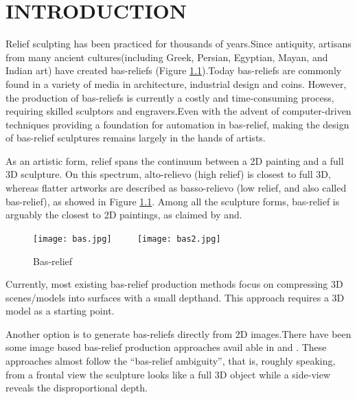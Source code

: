 \chapter{INTRODUCTION}

Relief sculpting has been practiced for thousands of years.Since antiquity, artisans from many ancient cultures(including Greek, Persian, Egyptian, Mayan, and Indian art) have created bas-reliefs (Figure \ref{bas:his}).Today bas-reliefs are commonly found in a variety of media in architecture, industrial design and coins. However, the production of bas-reliefs is currently a costly and time-consuming process, requiring skilled sculptors and engravers.Even with the advent of computer-driven techniques providing a foundation for automation in bas-relief, making the design of bas-relief sculptures remains largely in the hands of artists.

As an artistic form, relief spans the continuum between a 2D  painting and a full 3D sculpture\cite{weyrich2007digital}. On this spectrum, alto-relievo (high relief) is closest to full 3D, whereas flatter artworks are described as basso-relievo (low relief, and also called bas-relief), as showed in Figure \ref{bas:his}. Among all the sculpture forms, bas-relief is arguably the closest to 2D paintings, as claimed by\cite{kerber2009feature} and\cite{barron2012color}.
 
\begin{figure}[H]
	\centering
	\texttt{[image: bas.jpg]}
	~~~~
	\texttt{[image: bas2.jpg]}
	\caption{Bas-relief}
	\label{bas:his}  
\end{figure} 

Currently, most existing bas-relief production methods focus on compressing 3D scenes/models into surfaces with a small depth\cite{weyrich2007digital}and\cite{kerber2009feature}. This approach requires a 3D model as a starting point. 

Another option is to generate bas-reliefs directly from 2D images.There have been some image based bas-relief production approaches avail	able in\cite{zeng2014region}\cite{wu2013making} and \cite{alexa2010reliefs}. These approaches almost follow the “bas-relief ambiguity”\cite{belhumeur1999bas}, that is, roughly speaking, from a frontal view the sculpture looks like a full 3D object while a side-view reveals the disproportional depth. 

